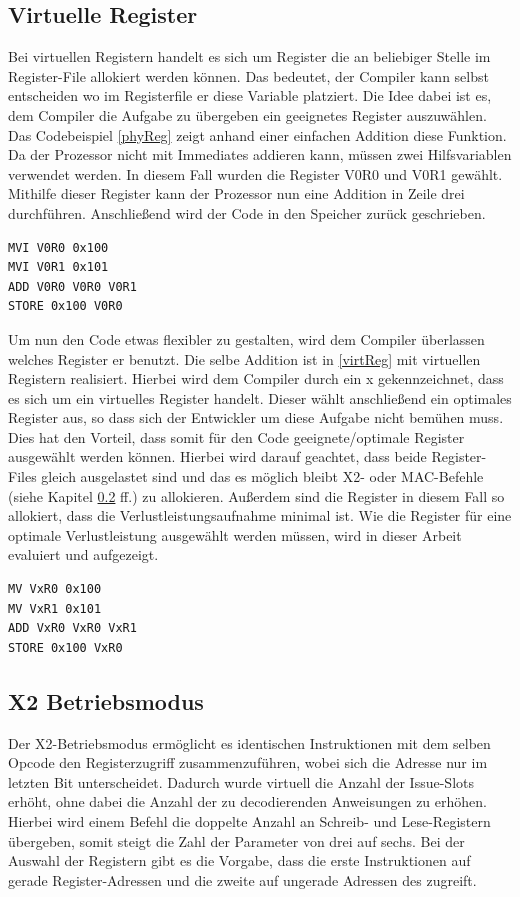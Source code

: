 \subsection{Virtuelle Register}
\label{sub:virtuelleR}
Bei virtuellen Registern handelt es sich um Register die an beliebiger Stelle im Register-File allokiert werden können. Das bedeutet, der Compiler kann selbst entscheiden wo im Registerfile er diese Variable platziert. 
Die Idee dabei ist es, dem Compiler die Aufgabe zu übergeben ein geeignetes Register auszuwählen. Das Codebeispiel \ref{phyReg} zeigt anhand einer einfachen Addition diese Funktion. Da der Prozessor nicht mit Immediates addieren kann, müssen zwei Hilfsvariablen verwendet werden. In diesem Fall wurden die Register V0R0 und V0R1 gewählt. Mithilfe dieser Register kann der Prozessor nun eine Addition in Zeile drei durchführen. Anschließend wird der Code in den Speicher zurück geschrieben.
\renewcommand{\lstlistingname}{Codebeispiel}
\begin{lstlisting}[frame=single, caption={physikalische Register},captionpos=b,label=phyReg]
MVI V0R0 0x100
MVI V0R1 0x101
ADD V0R0 V0R0 V0R1
STORE 0x100 V0R0
\end{lstlisting}
Um nun den Code etwas flexibler zu gestalten, wird dem Compiler überlassen welches Register er benutzt. Die selbe Addition ist in \ref{virtReg} mit virtuellen Registern realisiert. Hierbei wird dem Compiler durch ein x gekennzeichnet, dass es sich um ein virtuelles Register handelt. Dieser wählt anschließend ein optimales Register aus, so dass sich der Entwickler um diese Aufgabe nicht bemühen muss. Dies hat den Vorteil, dass somit für den Code geeignete/optimale Register ausgewählt werden können. Hierbei wird darauf geachtet, dass beide Register-Files gleich ausgelastet sind und das es möglich bleibt X2- oder MAC-Befehle (siehe Kapitel \ref{subsec:x2Mode} ff.) zu allokieren. Außerdem sind die Register in diesem Fall so allokiert, dass die Verlustleistungsaufnahme minimal ist. Wie die Register für eine optimale Verlustleistung ausgewählt werden müssen, wird in dieser Arbeit evaluiert und aufgezeigt.

\begin{lstlisting}[frame=single,caption={virtuelle Register},captionpos=b,label=virtReg]
MV VxR0 0x100
MV VxR1 0x101
ADD VxR0 VxR0 VxR1
STORE 0x100 VxR0
\end{lstlisting}
\subsection{X2 Betriebsmodus}\label{subsec:x2Mode}
Der X2-Betriebsmodus ermöglicht es identischen Instruktionen mit dem selben Opcode den Registerzugriff zusammenzuführen, wobei sich die Adresse nur im letzten Bit unterscheidet. Dadurch wurde virtuell die Anzahl der Issue-Slots erhöht, ohne dabei die Anzahl der zu decodierenden Anweisungen zu erhöhen. Hierbei wird einem Befehl die doppelte Anzahl an Schreib- und Lese-Registern übergeben, somit steigt die Zahl der Parameter von drei auf sechs. Bei der Auswahl der Registern gibt es die Vorgabe, dass die erste Instruktionen auf gerade Register-Adressen und die zweite auf ungerade Adressen des zugreift. \cite{paya2009instruction}
